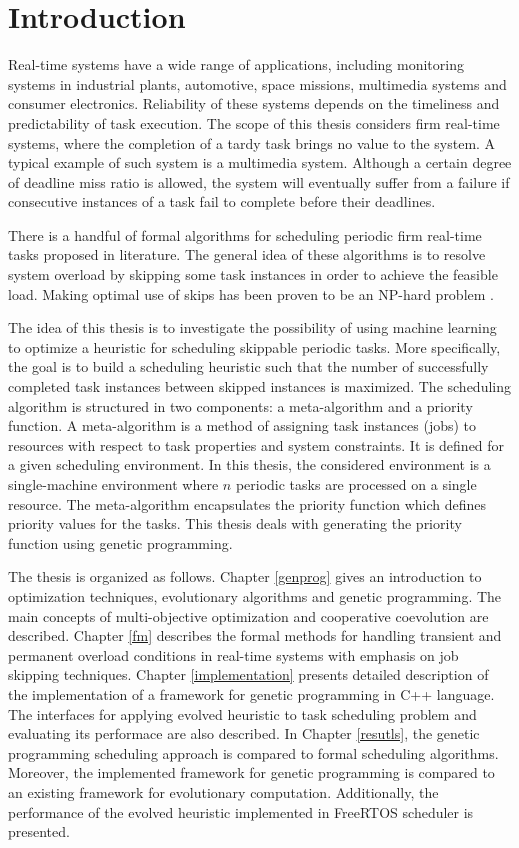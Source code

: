 \chapter{Introduction}
Real-time systems have a wide range of applications, including monitoring systems in industrial plants, automotive, space missions, multimedia systems and consumer electronics.
Reliability of these systems depends on the timeliness and predictability of task execution.
The scope of this thesis considers firm real-time systems, where the completion of a tardy task brings no value to the system.
A typical example of such system is a multimedia system.
Although a certain degree of deadline miss ratio is allowed, the system will eventually suffer from a failure if consecutive instances of a task fail to complete before their deadlines.

There is a handful of formal algorithms for scheduling periodic firm real-time tasks proposed in literature.
The general idea of these algorithms is to resolve system overload by skipping some task instances in order to achieve the feasible load.
Making optimal use of skips has been proven to be an NP-hard problem \cite{queudet2012quality}.

The idea of this thesis is to investigate the possibility of using machine learning to optimize a heuristic for scheduling skippable periodic tasks.
More specifically, the goal is to build a scheduling heuristic such that the number of successfully completed task instances between skipped instances is maximized.
The scheduling algorithm is structured in two components: a meta-algorithm and a priority function.
A meta-algorithm is a method of assigning task instances (jobs) to resources with respect to task properties and system constraints.
It is defined for a given scheduling environment.
In this thesis, the considered environment is a single-machine environment where $n$ periodic tasks are processed on a single resource. 
The meta-algorithm encapsulates the priority function which defines priority values for the tasks.
This thesis deals with generating the priority function using genetic programming.

The thesis is organized as follows.
Chapter \ref{genprog} gives an introduction to optimization techniques, evolutionary algorithms and genetic programming.
The main concepts of multi-objective optimization and cooperative coevolution are described.
Chapter \ref{fm} describes the formal methods for handling transient and permanent overload conditions in real-time systems with emphasis on job skipping techniques.
Chapter \ref{implementation} presents detailed description of the implementation of a framework for genetic programming in C++ language.
The interfaces for applying evolved heuristic to task scheduling problem and evaluating its performace are also described.
In Chapter \ref{resutls}, the genetic programming scheduling approach is compared to formal scheduling algorithms. Moreover, the implemented framework for genetic programming is compared to an existing framework for evolutionary computation.
Additionally, the performance of the evolved heuristic implemented in FreeRTOS scheduler is presented. 